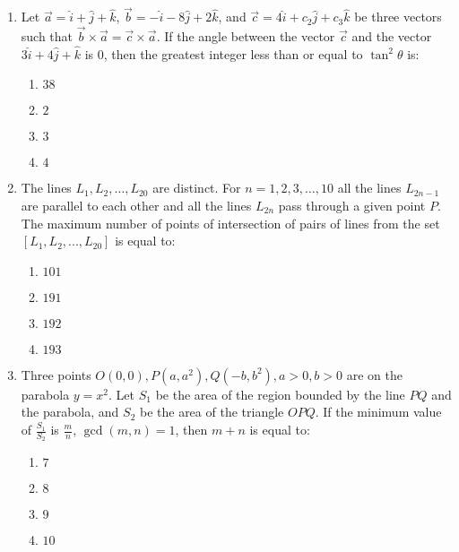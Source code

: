 \documentclass[journal]{IEEEtran}
\newcommand{\brak}[1]{\left( #1 \right)}
\newcommand{\sbrak}[1]{\left[ #1 \right]}
\begin{document}
\begin{enumerate}
    \item Let $\vec{a}=\hat{i}+\hat{j}+\hat{k}$, $\vec{b}=-\hat{i}-8\hat{j}+2\hat{k}$, and $\vec{c}=4\hat{i}+c_{2}\hat{j}+c_{3}\hat{k}$ be three vectors such that $\vec{b}\times\vec{a}=\vec{c}\times\vec{a}$. If the angle between the vector $\vec{c}$ and the vector $3\hat{i}+4\hat{j}+\hat{k}$ is $0$, then the greatest integer less than or equal to $\tan^{2}\theta$ is:

        \begin{multicols}{4}
        \begin{enumerate}
        \item $38$
        \item $2$
        \item $3$
        \item $4$
        \end{enumerate}
        \end{multicols}

    \item The lines $L_{1}, L_{2}, \ldots, L_{20}$ are distinct. For $n=1, 2, 3, \ldots, 10$ all the lines $L_{2n-1}$ are parallel to each other and all the lines $L_{2n}$ pass through a given point $P$. The maximum number of points of intersection of pairs of lines from the set $\sbrak{L_{1},L_{2},...,L_{20}}$ is equal to:

        \begin{multicols}{4}
        \begin{enumerate}
        \item $101$
        \item $191$
        \item $192$
        \item $193$
        \end{enumerate}
        \end{multicols}

    \item Three points $O\brak{0,0}, P\brak{a,a^{2}}, Q\brak{-b,b^{2}}, a>0, b>0$ are on the parabola $y=x^{2}$. Let $S_{1}$ be the area of the region bounded by the line $PQ$ and the parabola, and $S_{2}$ be the area of the triangle $OPQ$. If the minimum value of $\frac{S_{1}}{S_{2}}$ is $\frac{m}{n}$, $\gcd\brak{m,n}=1$, then $m+n$ is equal to:

        \begin{multicols}{4}
        \begin{enumerate}
        \item $7$
        \item $8$
        \item $9$
        \item $10$
        \end{enumerate}
        \end{multicols}


\end{enumerate}
\end{document}
